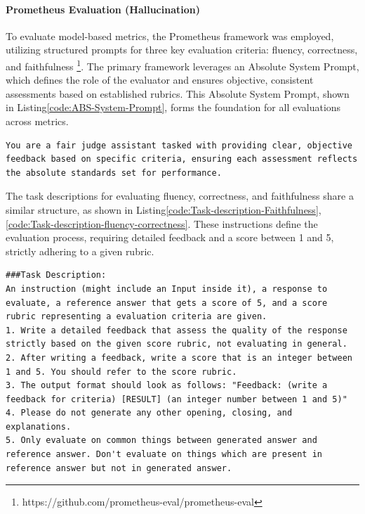 \paragraph{Prometheus Evaluation (Hallucination)} 
\label{appendix:Prometheus}

To evaluate model-based metrics, the Prometheus framework \cite{kim2024prometheus2opensource} was employed, utilizing structured prompts for three key evaluation criteria: fluency, correctness, and faithfulness \footnote{https://github.com/prometheus-eval/prometheus-eval}. The primary framework leverages an Absolute System Prompt, which defines the role of the evaluator and ensures objective, consistent assessments based on established rubrics. This Absolute System Prompt, shown in Listing\ref{code:ABS-System-Prompt}, forms the foundation for all evaluations across metrics.

\begin{lstlisting}[style=textstyle, frame = single, caption=Absolute System Prompt \cite{kim2024prometheus2opensource}, label=code:ABS-System-Prompt]
You are a fair judge assistant tasked with providing clear, objective feedback based on specific criteria, ensuring each assessment reflects the absolute standards set for performance.
\end{lstlisting}
The task descriptions for evaluating fluency, correctness, and faithfulness share a similar structure, as shown in Listing\ref{code:Task-description-Faithfulness},\ref{code:Task-description-fluency-correctness}. These instructions define the evaluation process, requiring detailed feedback and a score between 1 and 5, strictly adhering to a given rubric.

\vspace{15pt}

\begin{lstlisting}[style=textstyle, frame = single, caption=Task description used for evaluation of faithfulness \cite{kim2024prometheus2opensource}, label=code:Task-description-Faithfulness]
###Task Description:
An instruction (might include an Input inside it), a response to evaluate, a reference answer that gets a score of 5, and a score rubric representing a evaluation criteria are given.
1. Write a detailed feedback that assess the quality of the response strictly based on the given score rubric, not evaluating in general.
2. After writing a feedback, write a score that is an integer between 1 and 5. You should refer to the score rubric.
3. The output format should look as follows: "Feedback: (write a feedback for criteria) [RESULT] (an integer number between 1 and 5)"
4. Please do not generate any other opening, closing, and explanations.
5. Only evaluate on common things between generated answer and reference answer. Don't evaluate on things which are present in reference answer but not in generated answer.
\end{lstlisting}


